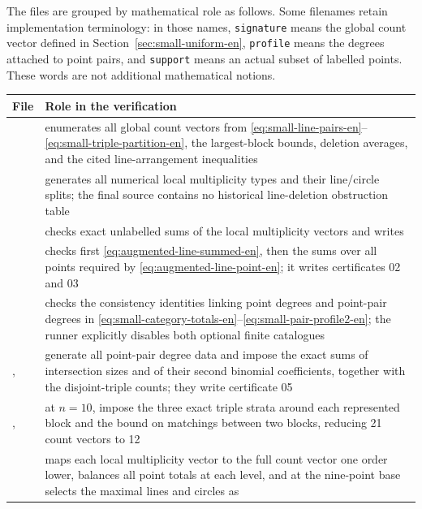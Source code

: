 The files are grouped by mathematical role as follows.
Some filenames retain implementation terminology: in those names,
\texttt{signature} means the global count vector defined in
Section~\ref{sec:small-uniform-en}, \texttt{profile} means the degrees attached
to point pairs, and \texttt{support} means an actual subset of labelled points.
These words are not additional mathematical notions.
\begin{longtable}{P{6.2cm}P{8.3cm}}
\toprule File & Role in the verification\\ \midrule
{} & enumerates all global count vectors from
\eqref{eq:small-line-pairs-en}--\eqref{eq:small-triple-partition-en}, the
largest-block bounds, deletion averages, and the cited line-arrangement
inequalities\\
 & generates all numerical local
multiplicity types and their line/circle splits; the final source contains no
historical line-deletion obstruction table\\
 & checks exact unlabelled sums of the local
multiplicity vectors and writes \\
 & checks first
\eqref{eq:augmented-line-summed-en}, then the sums over all points required by
\eqref{eq:augmented-line-point-en}; it writes certificates 02 and 03\\
 & checks the consistency
identities linking point degrees and point-pair degrees in
\eqref{eq:small-category-totals-en}--\eqref{eq:small-pair-profile2-en};
the runner explicitly disables both optional finite catalogues\\
,
 & generate all point-pair degree data and
impose the exact sums of intersection sizes and of their second binomial
coefficients, together with the disjoint-triple counts; they write
certificate 05\\
,
 & at $n=10$, impose the three exact
triple strata around each represented block and the bound on matchings between
two blocks, reducing 21 count vectors to 12\\
 & maps each local multiplicity vector
to the full count vector one order lower, balances all point totals at each
level, and at the nine-point base selects the maximal lines and circles as

\end{longtable}
